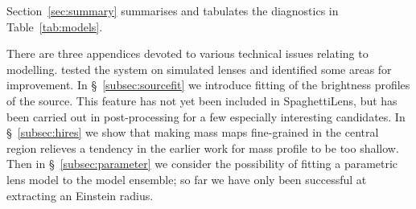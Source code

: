 Section~\ref{sec:summary} summarises and tabulates the diagnostics in
Table~\ref{tab:models}.

There are three appendices devoted to various technical issues
relating to modelling.  \cite{2015MNRAS.447.2170K} tested the system
on simulated lenses and identified some areas for improvement.  In
\S~\ref{subsec:sourcefit} we introduce fitting of the brightness
profiles of the source.  This feature has not yet been included in
SpaghettiLens, but has been carried out in post-processing for a few
especially interesting candidates.  In \S~\ref{subsec:hires} we show
that making mass maps fine-grained in the central region relieves a
tendency in the earlier work for mass profile to be too shallow. Then in
\S~\ref{subsec:parameter} we consider the possibility of fitting a
parametric lens model to the model ensemble; so far we have only been
successful at extracting an Einstein radius.



